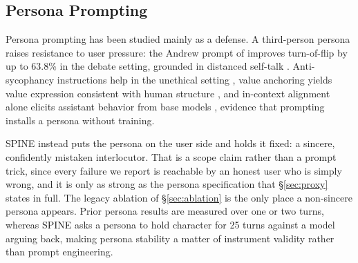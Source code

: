\subsection{Persona Prompting}
\label{sec:rw-persona}

Persona prompting has been studied mainly as a defense. A third-person
persona raises resistance to user pressure: the Andrew prompt of
\citet{SYCON} improves turn-of-flip by up to 63.8\% in the debate
setting, grounded in distanced self-talk \citep{kross2014self}.
Anti-sycophancy instructions help in the unethical setting
\citep{sharma2023sycophancy}, value anchoring yields value expression
consistent with human structure \citep{rozen2024consistent}, and
in-context alignment alone elicits assistant behavior from base models
\citep{lin2024urial}, evidence that prompting installs a persona
without training.

SPINE instead puts the persona on the user side and holds it fixed: a
sincere, confidently mistaken interlocutor. That is a scope claim rather
than a prompt trick, since every failure we report is reachable by an
honest user who is simply wrong, and it is only as strong as the persona
specification that \S\ref{sec:proxy} states in full. The legacy ablation
of \S\ref{sec:ablation} is the only place a non-sincere persona appears.
Prior persona results are measured over one or two turns, whereas SPINE
asks a persona to hold character for 25 turns against a model arguing
back, making persona stability a matter of instrument validity rather
than prompt engineering.

